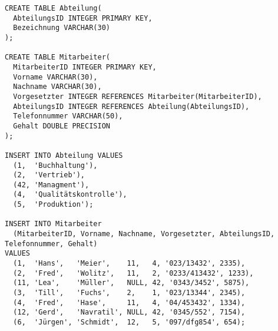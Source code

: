 \documentclass{bschlangaul-aufgabe}
\begin{document}
\begin{bAdditum}[Übungsdatenbank]
\begin{verbatim}
CREATE TABLE Abteilung(
  AbteilungsID INTEGER PRIMARY KEY,
  Bezeichnung VARCHAR(30)
);

CREATE TABLE Mitarbeiter(
  MitarbeiterID INTEGER PRIMARY KEY,
  Vorname VARCHAR(30),
  Nachname VARCHAR(30),
  Vorgesetzter INTEGER REFERENCES Mitarbeiter(MitarbeiterID),
  AbteilungsID INTEGER REFERENCES Abteilung(AbteilungsID),
  Telefonnummer VARCHAR(50),
  Gehalt DOUBLE PRECISION
);

INSERT INTO Abteilung VALUES
  (1,  'Buchhaltung'),
  (2,  'Vertrieb'),
  (42, 'Managment'),
  (4,  'Qualitätskontrolle'),
  (5,  'Produktion');

INSERT INTO Mitarbeiter
  (MitarbeiterID, Vorname, Nachname, Vorgesetzter, AbteilungsID, Telefonnummer, Gehalt)
VALUES
  (1,  'Hans',   'Meier',    11,   4, '023/13432', 2335),
  (2,  'Fred',   'Wolitz',   11,   2, '0233/413432', 1233),
  (11, 'Lea',    'Müller',   NULL, 42, '0343/3452', 5875),
  (3,  'Till',   'Fuchs',    2,    1, '023/13344', 2345),
  (4,  'Fred',   'Hase',     11,   4, '04/453432', 1334),
  (12, 'Gerd',   'Navratil', NULL, 42, '0345/552', 7154),
  (6,  'Jürgen', 'Schmidt',  12,   5, '097/dfg854', 654);
\end{verbatim}
\end{bAdditum}
\end{document}
